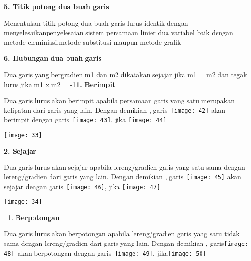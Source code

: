\documentclass[11pt,fleqn]{book} %
\begin{document}
\noindent \textbf{5.  Titik potong dua buah garis}

\noindent \textbf{}

\noindent Menentukan titik potong dua buah garis lurus identik dengan menyelesaikanpenyelesaian sistem persamaan linier dua variabel baik dengan metode eleminiasi,metode substitusi maupun metode grafik

\noindent 

\noindent \textbf{6.   Hubungan dua buah garis}

\noindent Dua garis yang bergradien m1 dan m2 dikatakan sejajar jika m1 = m2 dan tegak lurus jika m1 x m2 = -1\textbf{1. Berimpit}

\noindent Dua garis lurus akan berimpit apabila persamaan garis yang satu merupakan kelipatan dari garis yang lain. Dengan demikian , garis~\texttt{[image: 42]} akan berimpit dengan garis~\texttt{[image: 43]}, jika \texttt{[image: 44]}

\begin{center}
\noindent \texttt{[image: 33]}\textbf{}
\end{center}

\noindent \textbf{}

\noindent \textbf{2. Sejajar}

\noindent Dua garis lurus akan sejajar apabila lereng/gradien garis yang satu sama dengan lereng/gradien dari garis yang lain. Dengan demikian , garis~\texttt{[image: 45]} akan sejajar dengan garis~\texttt{[image: 46]}, jika \texttt{[image: 47]}

\begin{center}
\noindent \texttt{[image: 34]}
\end{center}

\noindent 

\begin{enumerate}
\item  \textbf{Berpotongan}
\end{enumerate}

\noindent Dua garis lurus akan berpotongan apabila lereng/gradien garis yang satu tidak sama dengan lereng/gradien dari garis yang lain. Dengan demikian , garis\texttt{[image: 48]}~akan berpotongan dengan garis~\texttt{[image: 49]}, jika\texttt{[image: 50]}
\end{document}
